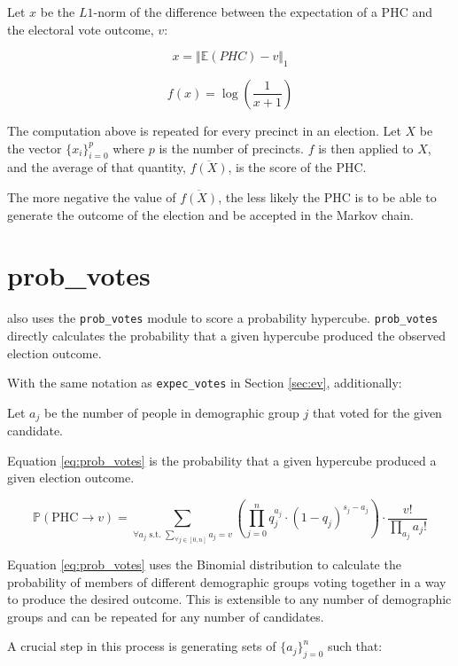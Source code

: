 Let $x$ be the $L1$-norm of the difference between the expectation of a PHC and the electoral vote outcome, $v$:

$$x = \Vert \mathbb{E}(PHC) - v \Vert_1$$

\begin{equation}
  f(x) = \log\left(\frac{1}{x + 1}\right)
  \label{eq:asymptote}
\end{equation}

The computation above is repeated for every precinct in an election. Let $X$ be the vector $\{x_i\}_{i=0}^p$ where $p$ is the number of precincts. $f$ is then applied to $X$, and the average of that quantity, $\overline{f(X)}$, is the score of the PHC.

The more negative the value of $\overline{f(X)}$, the less likely the PHC is to be able to generate the outcome of the election and be accepted in the Markov chain.


\section{prob\_votes}
\label{sec:pv}

 also uses the \texttt{prob\_votes} module to score a probability hypercube. \texttt{prob\_votes} directly calculates the probability that a given hypercube produced the observed election outcome.

With the same notation as \texttt{expec\_votes} in Section \ref{sec:ev}, additionally:

Let $a_j$ be the number of people in demographic group $j$ that voted for the given candidate.

Equation \ref{eq:prob_votes} is the probability that a given hypercube produced a given election outcome.

\begin{equation}
 \mathbb{P}(\text{PHC} \rightarrow v) =\sum_{\forall a_j \text{ s.t. } \sum_{\forall j \in [0, n]} a_j = v} \left(\prod_{j = 0}^n q_j^{a_j} \cdot (1 - q_j)^{s_j - a_j}\right) \cdot \frac{v!}{\prod_{a_j}a_j!}
 \label{eq:prob_votes}
\end{equation}

Equation \ref{eq:prob_votes} uses the Binomial distribution to calculate the probability of members of different demographic groups voting together in a way to produce the desired outcome. This is extensible to any number of demographic groups and can be repeated for any number of candidates.

A crucial step in this process is generating sets of $\{a_j\}_{j=0}^n$ such that:

